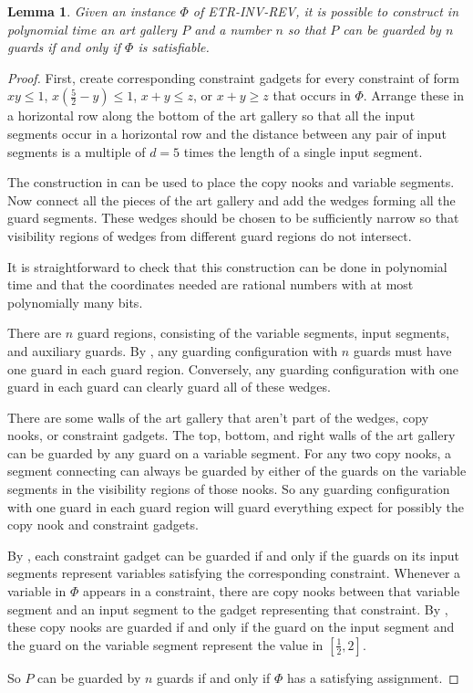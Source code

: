 \documentclass[11pt]{article}
\theoremstyle{plain}
\newtheorem{lemma}[theorem]{Lemma}
\theoremstyle{definition}
\numberwithin{theorem}{section}
\begin{document}
\begin{lemma}
Given an instance $\Phi$ of ETR-INV-REV, it is possible to construct in polynomial time an art gallery $P$ and a number $n$ so that $P$ can be guarded by $n$ guards if and only if $\Phi$ is satisfiable.
\end{lemma}

\begin{proof}
First, create corresponding constraint gadgets for every constraint of form $xy\le 1$, $x\left(\frac{5}2-y\right)\le 1$, $x+y\le z$, or $x+y\ge z$ that occurs in $\Phi$. Arrange these in a horizontal row along the bottom of the art gallery so that all the input segments occur in a horizontal row and the distance between any pair of input segments is a multiple of $d=5$ times the length of a single input segment.

The construction in  can be used to place the copy nooks and variable segments. Now connect all the pieces of the art gallery and add the wedges forming all the guard segments. These wedges should be chosen to be sufficiently narrow so that visibility regions of wedges from different guard regions do not intersect. 

It is straightforward to check that this construction can be done in polynomial time and that the coordinates needed are rational numbers with at most polynomially many bits.

There are $n$ guard regions, consisting of the variable segments, input segments, and auxiliary guards. By , any guarding configuration with $n$ guards must have one guard in each guard region. Conversely, any guarding configuration with one guard in each guard can clearly guard all of these wedges.

There are some walls of the art gallery that aren't part of the wedges, copy nooks, or constraint gadgets. The top, bottom, and right walls of the art gallery can be guarded by any guard on a variable segment. For any two copy nooks, a segment connecting can always be guarded by either of the guards on the variable segments in the visibility regions of those nooks. So any guarding configuration with one guard in each guard region will guard everything expect for possibly the copy nook and constraint gadgets.

By , each constraint gadget can be guarded if and only if the guards on its input segments represent variables satisfying the corresponding constraint. Whenever a variable in $\Phi$ appears in a constraint, there are copy nooks between that variable segment and an input segment to the gadget representing that constraint. By , these copy nooks are guarded if and only if the guard on the input segment and the guard on the variable segment represent the value in $[\frac12, 2]$.

So $P$ can be guarded by $n$ guards if and only if $\Phi$ has a satisfying assignment. 
\end{proof}
\end{document}
